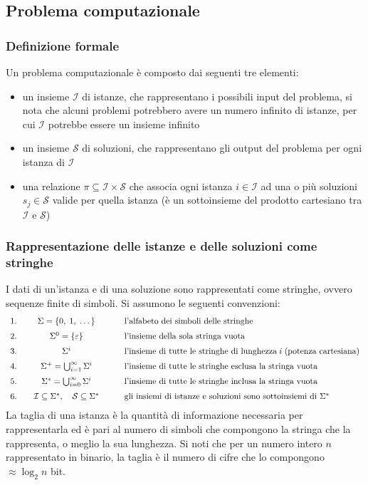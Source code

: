 \subsection{Problema computazionale}
\subsubsection*{Definizione formale}
Un problema computazionale è composto dai seguenti tre elementi:
\begin{itemize}
	\item un insieme \(\mathcal{I}\) di istanze, che rappresentano i possibili input del problema, si nota che alcuni
	problemi potrebbero avere un numero infinito di istanze, per cui \(\mathcal{I}\) potrebbe essere un insieme infinito
	\item un insieme \(\mathcal{S}\) di soluzioni, che rappresentano gli output del problema per ogni istanza
	di \(\mathcal{I}\)
	\item una relazione \(\pi \subseteq \mathcal{I} \times \mathcal{S}\) che associa ogni istanza \(i \in \mathcal{I}\)
	ad una o più soluzioni \(s_j \in \mathcal{S}\) valide per quella istanza (è un sottoinsieme del prodotto cartesiano
	tra \(\mathcal{I}\) e \(\mathcal{S}\))
\end{itemize}

\subsubsection*{Rappresentazione delle istanze e delle soluzioni come stringhe}
I dati di un'istanza e di una soluzione sono rappresentati come stringhe, ovvero sequenze finite di simboli. Si assumono
le seguenti convenzioni:
\[\begin{array}{c c l }
	1. & \quad \Sigma = \{ 0, \; 1, \; \dots \} & \qquad \text{l'alfabeto dei simboli delle stringhe} \\[6pt]
	2. & \quad \Sigma^0 = \{\varepsilon\} & \qquad \text{l'insieme della sola stringa vuota} \\[6pt]
	3. & \quad \Sigma^i & \qquad \text{l'insieme di tutte le stringhe di lunghezza} \; i \; \text{(potenza cartesiana)} \\[6pt]
	4. & \quad \Sigma^+ = \bigcup_{i = 1}^{\infty} \Sigma^i & \qquad \text{l'insieme di tutte le stringhe esclusa la stringa vuota} \\[6pt]
	5. & \quad \Sigma^* = \bigcup_{i =0}^{\infty} \Sigma^i & \qquad \text{l'insieme di tutte le stringhe inclusa la stringa vuota} \\[6pt]
	6. & \quad \mathcal{I} \subseteq \Sigma^*, \quad \mathcal{S} \subseteq \Sigma^* & \qquad \text{gli insiemi di istanze e soluzioni sono sottoinsiemi di } \Sigma^*
\end{array}\]
La taglia di una istanza è la quantità di informazione necessaria per rappresentarla ed è pari al numero di simboli che
compongono la stringa che la rappresenta, o meglio la sua lunghezza. Si noti che per un numero intero \(n\) rappresentato
in binario, la taglia è il numero di cifre che lo compongono \(\approx \log_{2} n\) bit.

